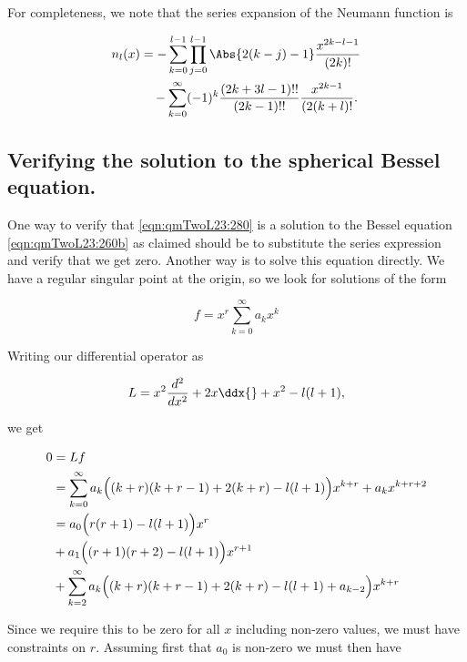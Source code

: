 For completeness, we note that the series expansion of the Neumann function is

\begin{equation}\label{eqn:qmTwoL23:920b}
\begin{aligned}
n_l(x)
&= 
-\sum_{k=0}^{l-1} 
\prod_{j=0}^{l-1}  \Abs{ 2(k-j)-1} \frac{x^{2 k -l -1}}{(2k)!} \\
&\quad -
\sum_{k=0}^\infty (-1)^k \frac{(2 k + 3 l - 1)!!}{(2k - 1)!!}
\frac{x^{2k-1}}{(2(k + l)!}.
\end{aligned}
\end{equation}

\subsection{Verifying the solution to the spherical Bessel equation.}

One way to verify that \ref{eqn:qmTwoL23:280} is a solution to the Bessel equation \ref{eqn:qmTwoL23:260b} as claimed should be to substitute the series expression and verify that we get zero.  Another way is to solve this equation directly.  We have a regular singular point at the origin, so we look for solutions of the form

\begin{equation}\label{eqn:qmTwoL23:1020}
f = x^r \sum_{k=0}^\infty a_k x^k
\end{equation}

Writing our differential operator as

\begin{equation}\label{eqn:qmTwoL23:1040}
L = x^2 \frac{d^2}{dx^2} + 2 x \ddx{} + x^2 - l(l+1),
\end{equation}

we get

\begin{align*}
0 
&= L f \\
&= \sum_{k=0}^\infty a_k \Bigl( (k+r)(k+r-1) + 2 (k + r) - l (l+1) \Bigr) x^{k + r} + a_k x^{k + r + 2} \\
&= 
a_0 \Bigl( 
r( r + 1) - l(l + 1)
\Bigr) x^r \\
&+
a_1 \Bigl( 
(r+ 1)( r + 2) - l(l + 1)
\Bigr) x^{r+1} \\
&+\sum_{k=2}^\infty a_k \Bigl( (k+r)(k+r-1) + 2 (k + r) - l (l+1) + a_{k-2} \Bigr) x^{k + r} 
\end{align*}

Since we require this to be zero for all $x$ including non-zero values, we must have constraints on $r$.  Assuming first that $a_0$ is non-zero we must then have

